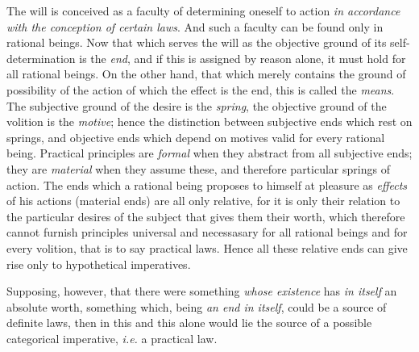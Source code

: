 The will is conceived as a faculty of determining oneself to action
\textit{in accordance with the conception of certain laws}. And such a
faculty can be found only in rational beings. Now that which serves
the will as the objective ground of its self-determination is the
\textit{end}, and if this is assigned by reason alone, it must hold
for all rational beings. On the other hand, that which merely contains
the ground of possibility of the action of which the effect is the
end, this is called the \textit{means}. The subjective ground of the
desire is the \textit{spring}, the objective ground of the volition is
the \textit{motive}; hence the distinction between subjective ends
which rest on springs, and objective ends which depend on motives
valid for every rational being. Practical principles are
\textit{formal} when they abstract from all subjective ends; they are
\textit{material} when they assume these, and therefore particular
springs of action. The ends which a rational being proposes to himself
at pleasure as \textit{effects} of his actions (material ends) are all
only relative, for it is only their relation to the particular desires
of the subject that gives them their worth,  which therefore
cannot furnish principles universal and necessasary for all rational
beings and for every volition, that is to say practical laws. Hence
all these relative ends can give rise only to hypothetical
imperatives.

Supposing, however, that there were something \textit{whose existence}
has \textit{in itself} an absolute worth, something which, being
\textit{an end in itself}, could be a source of definite laws, then in
this and this alone would lie the source of a possible categorical
imperative, \textit{i.e.} a practical law.

